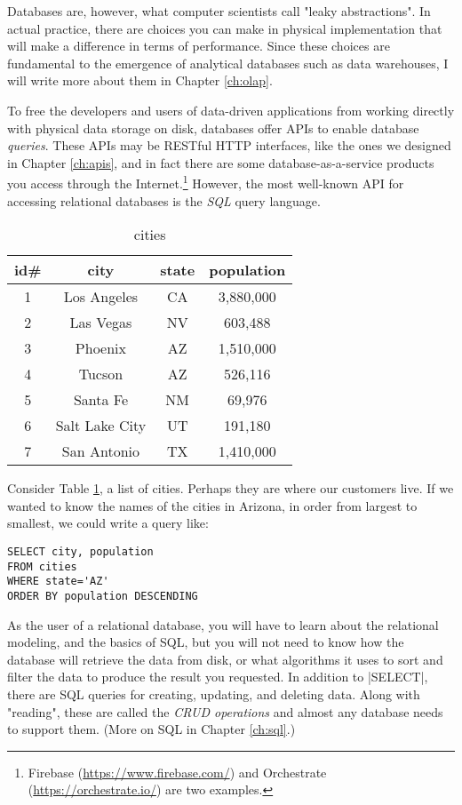 \documentclass[11pt]{book}
\newcommand{\term}[1]{\emph{#1}} %
\newcommand{\head}[1]{\textnormal{\textbf{#1}}} %
\begin{document}
Databases are, however, what computer scientists call "leaky abstractions".  In actual practice, there are choices you can make in physical implementation that will make a difference in terms of performance.  Since these choices are fundamental to the emergence of analytical databases such as data warehouses, I will write more about them in Chapter \ref{ch:olap}.

To free the developers and users of data-driven applications from working directly with physical data storage on disk, databases offer APIs to enable database \term{queries}.  These APIs may be RESTful HTTP interfaces, like the ones we designed in Chapter \ref{ch:apis}, and in fact there are some database-as-a-service products you access through the Internet.\footnote{Firebase (\url{https://www.firebase.com/}) and Orchestrate (\url{https://orchestrate.io/}) are two examples.}  However, the most well-known API for accessing relational databases is the \term{SQL} query language.

\begin{table}
\centering
\caption{cities}\label{tab:cities}
\vspace{10pt}
\begin{tabular}{cccc}
    \toprule[1.5pt]
    \head{id\#} & \head{city} & \head{state} & \head{population}\\
    \midrule
    1 & Los Angeles & CA & 3,880,000\\
    2 & Las Vegas & NV & 603,488\\
    3 & Phoenix & AZ & 1,510,000\\
    4 & Tucson & AZ & 526,116\\
    5 & Santa Fe & NM & 69,976\\
    6 & Salt Lake City & UT & 191,180\\
    7 & San Antonio & TX & 1,410,000\\
    \bottomrule[1.5pt]
\end{tabular}
\end{table}

Consider Table \ref{tab:cities}, a list of cities.  Perhaps they are where our customers live.  If we wanted to know the names of the cities in Arizona, in order from largest to smallest, we could write a query like:

\begin{verbatim}
SELECT city, population
FROM cities
WHERE state='AZ'
ORDER BY population DESCENDING
\end{verbatim}

As the user of a relational database, you will have to learn about the relational modeling, and the basics of SQL, but you will not need to know how the database will retrieve the data from disk, or what algorithms it uses to sort and filter the data to produce the result you requested.  In addition to |SELECT|, there are SQL queries for creating, updating, and deleting data.  Along with "reading", these are called the \term{CRUD operations} and almost any database needs to support them.  (More on SQL in Chapter \ref{ch:sql}.)
\end{document}
